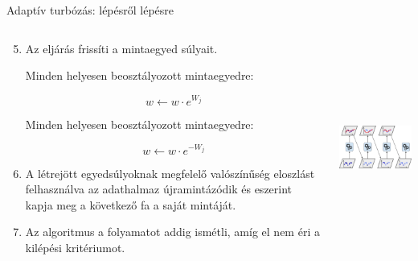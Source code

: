 \documentclass[english, aspectratio=169]{beamer}
\begin{document}
\begin{frame}{Adaptív turbózás: lépésről lépésre}
\begin{columns}
\begin{column}{.6\textwidth}
\begin{enumerate}
	\setcounter{enumi}{4}
	\item Az eljárás frissíti a mintaegyed súlyait.\par\smallskip 
	Minden helyesen beosztályozott mintaegyedre:
	\begin{block}{}
	\vspace{-0.2cm}
	\[
	w \leftarrow w \cdot e^{W_j}
	\]
	\end{block}
	Minden helyesen beosztályozott mintaegyedre:
	\begin{block}{}
	\vspace{-0.2cm}
	\[
	w \leftarrow w \cdot e^{-W_j}
	\]
	\end{block}
	\item A létrejött egyedsúlyoknak megfelelő valószínűség eloszlást felhasználva az adathalmaz újramintázódik és eszerint kapja meg a következő fa a saját mintáját. 
	\item Az algoritmus a folyamatot addig ismétli, amíg el nem éri a kilépési kritériumot.
\end{enumerate}
\end{column}
\begin{column}{.4\textwidth}
\begin{center}
\includegraphics[width=6cm, height=7cm, keepaspectratio]{images/ensemble_7.png}
\end{center}
\end{column}
\end{columns}
\end{frame}
\end{document}
